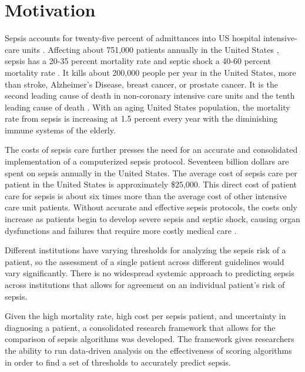 \documentclass{sig-alternate}
\begin{document}
\section{Motivation}
\vspace{10pt}
\label{sec:motivation}

Sepsis accounts for twenty-five percent of admittances into US hospital intensive-care units \cite{epi}. Affecting about 751,000 patients annually in the United States \cite{sepsis_def}, sepsis has a 20-35 percent mortality rate and septic shock a 40-60 percent mortality rate \cite{meds}. It kills about 200,000 people per year in the United States, more than stroke, Alzheimer's Disease, breast cancer, or prostate cancer. It is the second leading cause of death in non-coronary intensive care units and the tenth leading cause of death \cite{epi}. With an aging United States population, the mortality rate from sepsis is increasing at 1.5 percent every year with the diminishing immune systems of the elderly.

The costs of sepsis care further presses the need for an accurate and consolidated implementation of a computerized sepsis protocol. Seventeen billion dollars are spent on sepsis annually in the United States. The average cost of sepsis care per patient in the United States is approximately \$25,000. This direct cost of patient care for sepsis is about six times more than the average cost of other intensive care unit patients. Without accurate and effective sepsis protocols, the costs only increase as patients begin to develop severe sepsis and septic shock, causing organ dysfunctions and failures that require more costly medical care \cite{yearbook}.

Different institutions have varying thresholds for analyzing the sepsis risk of a patient, so the assessment of a single patient across different guidelines would vary significantly. There is no widespread systemic approach to predicting sepsis across institutions that allows for agreement on an individual patient's risk of sepsis. 

Given the high mortality rate, high cost per sepsis patient, and uncertainty in diagnosing a patient, a consolidated research framework that allows for the comparison of sepsis algorithms was developed.  The framework gives researchers the ability to run data-driven analysis on the effectiveness of scoring algorithms in order to find a set of thresholds to accurately predict sepsis.

\vspace{10pt}
\end{document}
